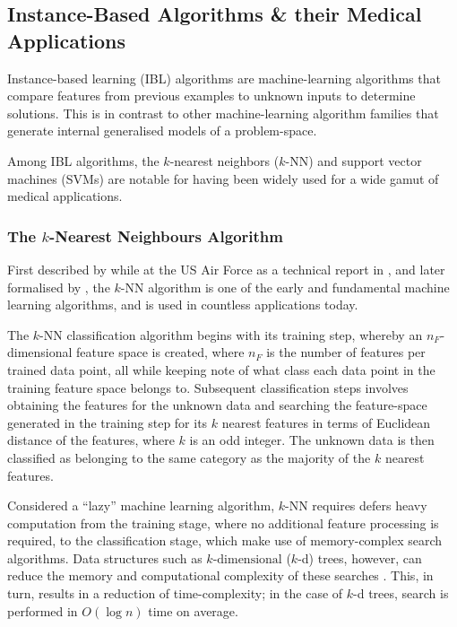 \subsection{Instance-Based Algorithms \& their Medical Applications}

Instance-based learning (IBL) algorithms are machine-learning algorithms that compare features from previous examples to unknown inputs to determine solutions. This is in contrast to other machine-learning algorithm families that generate internal generalised models of a problem-space.


Among IBL algorithms, the $k$-nearest neighbors ($k$-NN) and support vector machines (SVMs) are notable for having been widely used for a wide gamut of medical applications.

\subsubsection{The $k$-Nearest Neighbours Algorithm}

First described by \citeauthor{fix1951} while at the US Air Force as a technical report in \citeyear{fix1951}, and later formalised by \citeauthor{hart1967}, the $k$-NN algorithm is one of the early and fundamental machine learning algorithms, and is used in countless applications today.

The $k$-NN classification algorithm begins with its training step, whereby an $n_F$-dimensional feature space is created, where $n_F$ is the number of features per trained data point, all while keeping note of what class each data point in the training feature space belongs to. Subsequent classification steps involves obtaining the features for the unknown data and searching the feature-space generated in the training step for its $k$ nearest features in terms of Euclidean distance of the features, where $k$ is an odd integer. The unknown data is then classified as belonging to the same category as the majority of the $k$ nearest features.

Considered a ``lazy'' machine learning algorithm, $k$-NN requires defers heavy computation from the training stage, where no additional feature processing is required, to the classification stage, which make use of memory-complex search algorithms. Data structures such as $k\textrm{-dimensional}$ ($k$-d) trees, however, can reduce the memory and computational complexity of these searches \citep{otair2013}. This, in turn, results in a reduction of time-complexity; in the case of $k$-d trees, search is performed in $O(\log n)$ time on average.

